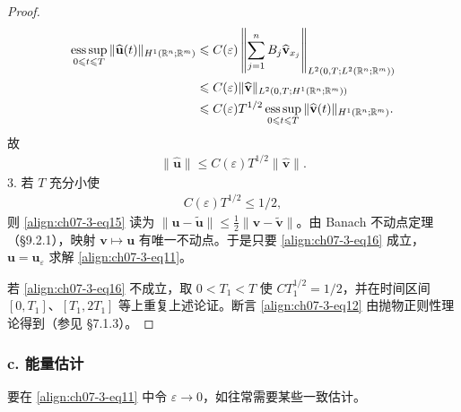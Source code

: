 \documentclass[../../main.tex]{subfiles}
\begin{document}
\begin{theorem}[逼近解的存在性]
\begin{proof}
\begin{align}
\operatorname*{ess\,sup}_{0\leqslant t\leqslant T}\|\widehat{\mathbf{u}}(t)\|_{H^1(\mathbb{R}^n;\mathbb{R}^m)}&\leqslant C(\varepsilon)\left\|\sum_{j=1}^n B_j\widehat{\mathbf{v}}_{x_j}\right\|_{L^2(0,T;L^2(\mathbb{R}^n;\mathbb{R}^m))}\notag\\
&\leqslant C(\varepsilon)\|\widehat{\mathbf{v}}\|_{L^2(0,T;H^1(\mathbb{R}^n;\mathbb{R}^m))}\notag\\
&\leqslant C(\varepsilon)T^{1/2}\operatorname*{ess\,sup}_{0\leqslant t\leqslant T}\|\widehat{\mathbf{v}}(t)\|_{H^1(\mathbb{R}^n;\mathbb{R}^m)}.\label{align:ch07-3-eq14}
\end{align}
故
\begin{align}
\|\widehat{\mathbf{u}}\|\leqslant C(\varepsilon)T^{1/2}\|\widehat{\mathbf{v}}\|.\label{align:ch07-3-eq15}
\end{align}
3. 若 $T$ 充分小使
\begin{align}
C(\varepsilon)T^{1/2}\leqslant 1/2,\label{align:ch07-3-eq16}
\end{align}
则 \eqref{align:ch07-3-eq15} 读为 $\|\mathbf{u}-\widetilde{\mathbf{u}}\|\leqslant\frac12\|\mathbf{v}-\widetilde{\mathbf{v}}\|$。由 Banach 不动点定理（\S9.2.1），映射 $\mathbf{v}\mapsto\mathbf{u}$ 有唯一不动点。于是只要 \eqref{align:ch07-3-eq16} 成立，$\mathbf{u}=\mathbf{u}_\varepsilon$ 求解 \eqref{align:ch07-3-eq11}。

若 \eqref{align:ch07-3-eq16} 不成立，取 $0<T_1<T$ 使 $CT_1^{1/2}=1/2$，并在时间区间 $[0,T_1]$、$[T_1,2T_1]$ 等上重复上述论证。断言 \eqref{align:ch07-3-eq12} 由抛物正则性理论得到（参见 \S7.1.3）。
\end{proof}
\end{theorem}

\subsubsection*{c. 能量估计}\label{subsubsection:ch07-3-2-c-能量估计}

要在 \eqref{align:ch07-3-eq11} 中令 $\varepsilon\to 0$，如往常需要某些一致估计。
\end{document}
